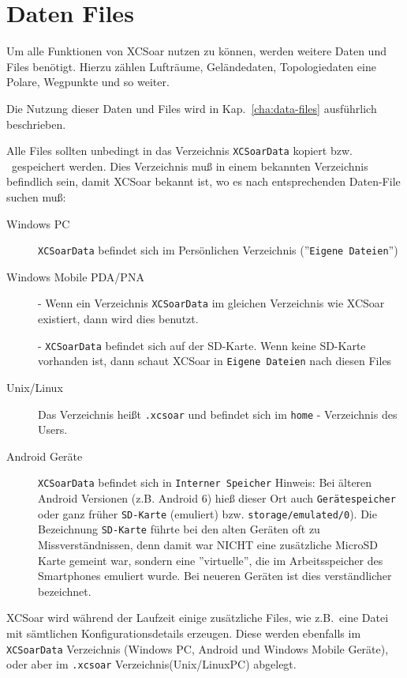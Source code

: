 \section{Daten Files}\label{InstallationDatenfiles}

Um alle Funktionen von {\textsf  XCSoar} nutzen zu können, werden weitere Daten und Files benötigt.
Hierzu zählen Lufträume, Geländedaten, Topologiedaten eine Polare, Wegpunkte und so weiter. 


Die Nutzung dieser Daten und Files wird in Kap.~\ref{cha:data-files} ausführlich beschrieben. 

Alle Files sollten unbedingt in das Verzeichnis \texttt{XCSoarData} kopiert bzw. \ gespeichert werden. 
Dies Verzeichnis muß  in einem bekannten Verzeichnis befindlich sein, damit {\textsf  XCSoar} bekannt ist, wo es nach entsprechenden 
Daten-File suchen muß: 

 
\begin{description}
\item[Windows PC]
\texttt{XCSoarData} befindet sich im Persönlichen Verzeichnis (''\texttt{Eigene Dateien}'')
\item[Windows Mobile PDA/PNA]
- Wenn ein Verzeichnis \texttt{XCSoarData} im gleichen Verzeichnis wie {\textsf  XCSoar} existiert, dann wird dies benutzt.  


- \texttt{XCSoarData} befindet sich auf der SD-Karte.  Wenn keine SD-Karte vorhanden ist, dann schaut {\textsf  XCSoar} in \texttt{Eigene Dateien} nach diesen Files

\item[Unix/Linux]
Das Verzeichnis heißt \verb|.xcsoar| und befindet sich im \verb|home| - Verzeichnis des Users. 
\item[Android Geräte]
\texttt{XCSoarData} befindet sich in \texttt{Interner Speicher}
Hinweis: Bei älteren Android Versionen (z.B. Android 6) hieß dieser Ort auch \texttt{Gerätespeicher} oder ganz früher \texttt{SD-Karte} (emuliert) bzw. \texttt{storage/emulated/0}). Die Bezeichnung \texttt{SD-Karte} führte bei den alten Geräten oft zu Missverständnissen,  denn damit war NICHT eine zusätzliche MicroSD Karte gemeint war, sondern eine ''virtuelle'', die im Arbeitsspeicher des Smartphones emuliert wurde. Bei neueren Geräten ist dies verständlicher bezeichnet. 
\end{description}


{\textsf  XCSoar} wird während der Laufzeit einige zusätzliche Files, wie z.B.\ eine Datei mit sämtlichen Konfigurationsdetails erzeugen.
Diese werden ebenfalls im \texttt{XCSoarData} Verzeichnis (Windows PC, Android und Windows Mobile Geräte), oder aber im \texttt{.xcsoar} 
Verzeichnis(Unix/LinuxPC) abgelegt. 

